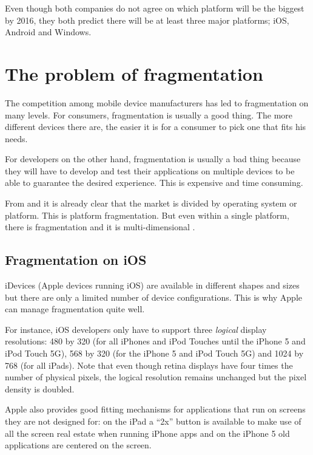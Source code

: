 Even though both companies do not agree on which platform will be the biggest by 2016, they both predict there will be at least three major platforms; iOS, Android and Windows. 

\section{The problem of fragmentation}

The competition among mobile device manufacturers has led to fragmentation on many levels. For consumers, fragmentation is usually a good thing. The more different devices there are, the easier it is for a consumer to pick one that fits his needs. 

For developers on the other hand, fragmentation is usually a bad thing because they will have to develop and test their applications on multiple devices to be able to guarantee the desired experience. This is expensive and time consuming.

From  and  it is already clear that the market is divided by operating system or platform. This is platform fragmentation. But even within a single platform, there is fragmentation and it is multi-dimensional \citep{Kindel}.


\subsection{Fragmentation on iOS}

iDevices (Apple devices running iOS) are available in different shapes and sizes but there are only a limited number of device configurations. This is why Apple can manage fragmentation quite well. 

For instance, iOS developers only have to support three \emph{logical} display resolutions: 480 by 320 (for all iPhones and iPod Touches until the iPhone 5 and iPod Touch 5G), 568 by 320 (for the iPhone 5 and iPod Touch 5G) and 1024 by 768 (for all iPads). Note that even though retina displays have four times the number of physical pixels, the logical resolution remains unchanged but the pixel density is doubled. 

Apple also provides good fitting mechanisms for applications that run on screens they are not designed for: on the iPad a ``2x'' button is available to make use of  all the screen real estate when running iPhone apps and on the iPhone 5 old applications are centered on the screen.

